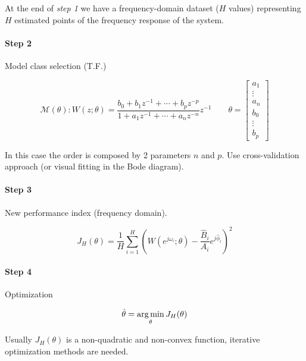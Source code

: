 At the end of \emph{step 1} we have a frequency-domain dataset ($H$ values) representing $H$ estimated points of the frequency response of the system.

\paragraph{Step 2} Model class selection (T.F.)

\[
    \mathcal{M}(\theta): W(z; \theta) = \frac{b_0+b_1z^{-1}+\cdots+b_pz^{-p}}{1+a_1z^{-1}+\cdots+a_nz^{-n}}z^{-1}
    \qquad
    \theta = \begin{bmatrix}
        a_1 \\ \vdots \\ a_n \\ b_0 \\ \vdots \\ b_p
    \end{bmatrix}
\]

\begin{remark}
    In this case the order is composed by 2 parameters $n$ and $p$.
    Use cross-validation approach (or visual fitting in the Bode diagram).
\end{remark}

\paragraph{Step 3} New performance index (frequency domain).

\[
    J_H(\theta) = \frac{1}{H} \sum_{i=1}^H \left(W(e^{j\omega_i}; \theta) - \frac{\hat{B}_i}{A_i}e^{j\hat{\phi}_i} \right)^2
\]

\paragraph{Step 4} Optimization

\[
    \hat{\theta} = \operatorname*{arg\,min}_\theta J_H(\theta)
\]

Usually $J_H(\theta)$ is a non-quadratic and non-convex function, iterative optimization methods are needed.

